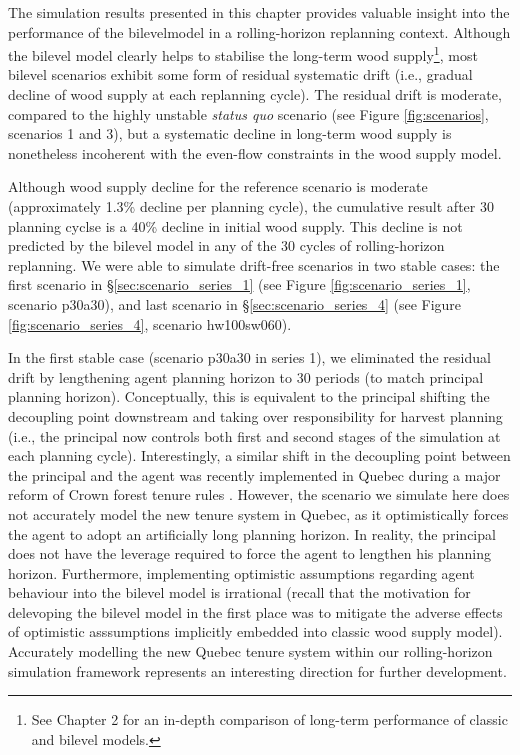 The simulation results presented in this chapter provides valuable insight into the performance of the bilevelmodel in a rolling-horizon replanning context. Although the bilevel model clearly helps to stabilise the long-term wood supply\footnote{See Chapter 2 for an in-depth comparison of long-term performance of classic and bilevel models.}, most bilevel scenarios exhibit some form of residual systematic drift (i.e., gradual decline of wood supply at each replanning cycle). The residual drift is moderate, compared to the highly unstable \emph{status quo} scenario (see Figure \ref{fig:scenarios}, scenarios 1 and 3), but a systematic decline in long-term wood supply is nonetheless incoherent with the even-flow constraints in the wood supply model. 

Although wood supply decline for the reference scenario is moderate (approximately 1.3\% decline per planning cycle), the cumulative result after 30 planning cyclse is a 40\% decline in initial wood supply. This decline is not predicted by the bilevel model in any of the 30 cycles of rolling-horizon replanning. We were able to simulate drift-free scenarios in two stable cases: the first scenario in \S\ref{sec:scenario_series_1} (see Figure \ref{fig:scenario_series_1}, scenario p30a30), and last scenario in \S\ref{sec:scenario_series_4} (see Figure \ref{fig:scenario_series_4}, scenario hw100sw060). 

In the first stable case (scenario p30a30 in series 1), we eliminated the residual drift by lengthening agent planning horizon to 30 periods (to match principal planning horizon). 
Conceptually, this is equivalent to the principal shifting the decoupling point downstream and taking over responsibility for harvest planning (i.e., the principal now controls both first and second stages of the simulation at each planning cycle).
Interestingly, a similar shift in the decoupling point between the principal and the agent was recently implemented in Quebec during a major reform of Crown forest tenure rules \citep{quebec2011loi}. 
However, the scenario we simulate here does not accurately model the new tenure system in Quebec, as it optimistically forces the agent to adopt an artificially long planning horizon. 
In reality, the principal does not have the leverage required to force the agent to lengthen his planning horizon. 
Furthermore, implementing optimistic assumptions regarding agent behaviour into the bilevel model is irrational (recall that the motivation for delevoping the bilevel model in the first place was to mitigate the adverse effects of optimistic asssumptions implicitly embedded into classic wood supply model).
Accurately modelling the new Quebec tenure system within our rolling-horizon simulation framework represents an interesting direction for further development.

